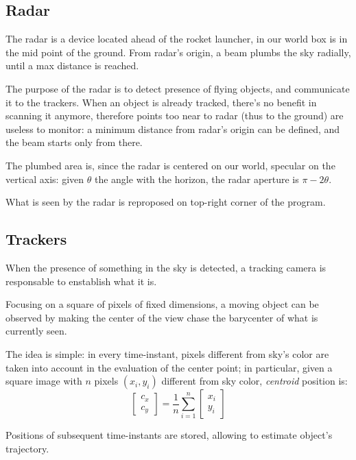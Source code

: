 \documentclass[notitlepage,a4paper,10pt]{article} %
\begin{document}
	\subsection{Radar}

		The radar is a device located ahead of the rocket launcher, in our world box is in the mid point of the ground. From radar's origin, a beam plumbs the sky radially, until a max distance is reached.

		The purpose of the radar is to detect presence of flying objects, and communicate it to the trackers. When an object is already tracked, there's no benefit in scanning it anymore, therefore points too near to radar (thus to the ground) are useless to monitor: a minimum distance from radar's origin can be defined, and the beam starts only from there.

		The plumbed area is, since the radar is centered on our world, specular on the vertical axis: given $\theta$ the angle with the horizon, the radar aperture is $\pi - 2\theta$.

		What is seen by the radar is reproposed on top-right corner of the program.

	\subsection{Trackers}

		When the presence of something in the sky is detected, a tracking camera is responsable to enstablish what it is.

		Focusing on a square of pixels of fixed dimensions, a moving object can be observed by making the center of the view chase the barycenter of what is currently seen.

		The idea is simple: in every time-instant, pixels different from sky's color are taken into account in the evaluation of the center point; in particular, given a square image with $n$ pixels $(x_i,y_i)$ different from sky color, \emph{centroid} position is:
		\begin{equation}
			\begin{bmatrix} c_x \\ c_y \end{bmatrix} = \frac{1}{n} \sum_{i=1}^n \begin{bmatrix} x_i \\ y_i \end{bmatrix}
		\end{equation}

		Positions of subsequent time-instants are stored, allowing to estimate object's trajectory.
\end{document}
